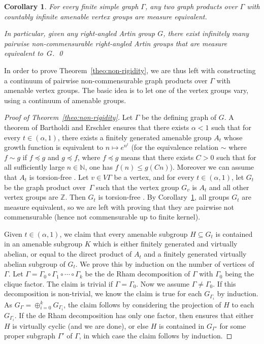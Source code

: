 \documentclass[11pt]{article}
\numberwithin{equation}{section}
\theoremstyle{plain}
\newtheorem{cor}[theo]{Corollary}
\theoremstyle{definition}
\begin{document}
\begin{cor}\label{cor:flexibility}
For every finite simple graph $\Gamma$, any two graph products over $\Gamma$ with countably infinite amenable vertex groups are measure equivalent.

In particular, given any right-angled Artin group $G$, there exist infinitely many pairwise non-commensurable right-angled Artin groups that are measure equivalent to~$G$.
\qed
\end{cor}

In order to prove Theorem~\ref{theo:non-rigidity}, we are thus left with constructing a continuum of pairwise non-commensurable graph products over $\Gamma$ with amenable vertex groups. The basic idea is to let one of the vertex groups vary, using a continuum of amenable groups.

\begin{proof}[Proof of Theorem~\ref{theo:non-rigidity}]
Let $\Gamma$ be the defining graph of $G$. A theorem of Bartholdi and Erschler \cite{BE} ensures that there exists $\alpha<1$ such that for every $t\in (\alpha,1)$, there exists a finitely generated amenable group $A_t$ whose growth function is equivalent to $n\mapsto e^{n^{t}}$ (for the equivalence relation $\sim$ where $f\sim g$ if $f\preceq g$ and $g\preceq f$, where $f\preceq g$ means that there exists $C>0$ such that for all sufficiently large $n\in\mathbb{N}$, one has $f(n)\le g(Cn)$). Moreover we can assume that $A_t$ is torsion-free \cite[Rem.\,1.1]{BE}. Let $v\in V\Gamma$ be a vertex, and for every $t\in (\alpha,1)$, let $G_t$ be the graph product over~$\Gamma$ such that the vertex group $G_v$ is $A_t$ and all other vertex groups are $\mathbb Z$. Then $G_t$ is torsion-free \cite[Cor.\,5.9]{antolin2015tits}. By Corollary~\ref{cor:flexibility}, all groups $G_t$ are measure equivalent, so we are left with proving that they are pairwise not commensurable (hence not commensurable up to finite kernel).

Given $t\in (\alpha,1)$, we claim that every amenable subgroup $H\subseteq G_t$ is contained in an amenable subgroup $K$ which is either finitely generated and virtually abelian, or equal to the direct product of $A_t$ and a finitely generated virtually abelian subgroup of $G_t$. We prove this by induction on the number of vertices of $\Gamma$. Let $\Gamma=\Gamma_0\circ \Gamma_1\circ\cdots\circ\Gamma_k$ be the de Rham decomposition of $\Gamma$ with $\Gamma_0$ being the clique factor. The claim is trivial if $\Gamma=\Gamma_0$. Now we assume $\Gamma\neq\Gamma_0$. If this decomposition is non-trivial, we know the claim is true for each $G_{\Gamma_i}$ by induction. As $G_{\Gamma}=\oplus_{i=0}^kG_{\Gamma_i}$, the claim follows by considering the projection of $H$ to each $G_{\Gamma_i}$. If the de Rham decomposition has only one factor, then \cite[Th.\,4.1]{antolin2015tits} ensures that either $H$ is virtually cyclic (and we are done), or else $H$ is contained in $G_{\Gamma'}$ for some proper subgraph $\Gamma'$ of $\Gamma$, in which case the claim follows by induction.


\end{proof}
\end{document}
